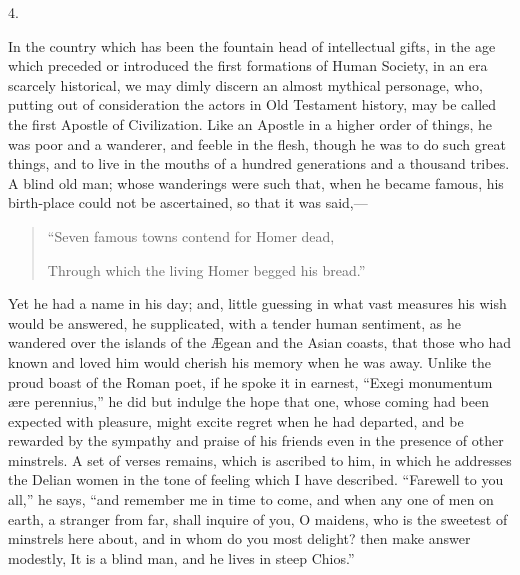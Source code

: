 4.

In the country which has been the fountain head of
intellectual gifts, in the age which preceded or introduced the first
formations of Human Society, in an era scarcely historical, we may
dimly discern an almost mythical personage, who, putting out of
consideration the actors in Old Testament history, may be called the
first Apostle of Civilization. Like an Apostle in a higher order of
things, he was poor and a wanderer, and feeble in the flesh, though he
was to do such great things, and to live in the mouths of a hundred
generations and a thousand tribes. A blind old man; whose wanderings
were such that, when he became famous, his birth-place could not be
ascertained, so that it was said,—

\begin{quote}

``Seven famous towns contend for Homer dead,

Through which the living Homer begged his bread.''

\end{quote}

Yet he had a name in his day; and, little guessing in what vast
measures his wish would be answered, he supplicated, with a tender
human sentiment, as he wandered over the islands of the Ægean and the
Asian coasts, that those who had known and loved him would cherish his
memory when he was away. Unlike the proud boast of the Roman poet, if
he spoke it in earnest, ``Exegi monumentum ære perennius,''
he did but indulge the hope that one, whose coming had been expected
with pleasure, might excite regret when he had departed, and be
rewarded by the sympathy and praise of his friends even in the
presence of other minstrels. A set of verses remains, which is
ascribed to him, in which he addresses the Delian women in the tone of
feeling which I have described. ``Farewell to you all,'' he
says, ``and remember me in time to come, and when any one of men
on earth, a stranger from far, shall inquire of you, O maidens, who is
the sweetest of minstrels here about, and in whom do you most
delight? then make answer modestly, It is a blind man, and he lives in
steep Chios.''

